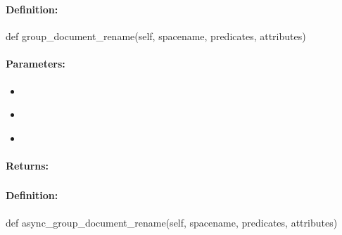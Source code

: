 \pagebreak
\subsubsection{}
\label{api:python:group_document_rename}


\paragraph{Definition:}
\begin{pythoncode}
def group_document_rename(self, spacename, predicates, attributes)
\end{pythoncode}

\paragraph{Parameters:}
\begin{itemize}[noitemsep]
\item {}\\

\item {}\\

\item {}\\

\end{itemize}

\paragraph{Returns:}


\pagebreak
\subsubsection{}
\label{api:python:async_group_document_rename}


\paragraph{Definition:}
\begin{pythoncode}
def async_group_document_rename(self, spacename, predicates, attributes)
\end{pythoncode}

